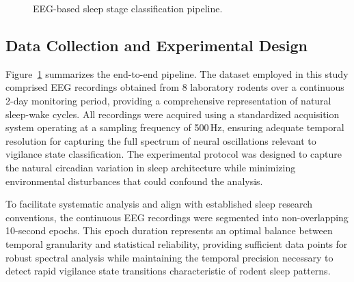 \documentclass[letterpaper]{article} %
\begin{document}
\begin{figure}[t]
\centering
{}
\caption{EEG-based sleep stage classification pipeline.}
\label{fig:pipeline}
\end{figure}

\subsection{Data Collection and Experimental Design}
Figure~\ref{fig:pipeline} summarizes the end-to-end pipeline. The dataset employed in this study comprised EEG recordings obtained from 8 laboratory rodents over a continuous 2-day monitoring period, providing a comprehensive representation of natural sleep-wake cycles. All recordings were acquired using a standardized acquisition system operating at a sampling frequency of 500\,Hz, ensuring adequate temporal resolution for capturing the full spectrum of neural oscillations relevant to vigilance state classification. The experimental protocol was designed to capture the natural circadian variation in sleep architecture while minimizing environmental disturbances that could confound the analysis.

To facilitate systematic analysis and align with established sleep research conventions, the continuous EEG recordings were segmented into non-overlapping 10-second epochs. This epoch duration represents an optimal balance between temporal granularity and statistical reliability, providing sufficient data points for robust spectral analysis while maintaining the temporal precision necessary to detect rapid vigilance state transitions characteristic of rodent sleep patterns.
\end{document}

